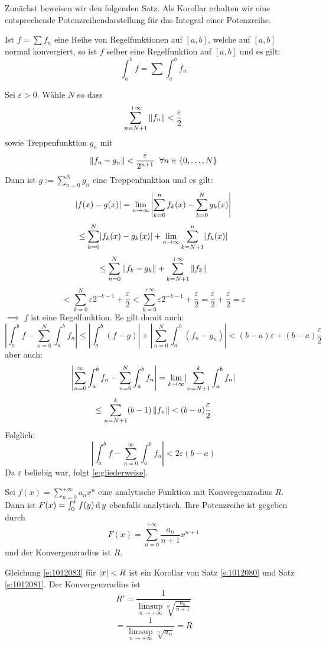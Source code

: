 Zun\"achst beweisen wir den folgenden Satz. Als Korollar erhalten wir eine
entsprechende Potenzreihendarstellung f\"ur das Integral einer Potenzreihe.

\begin{Sat}\label{s:1012081}
  Ist $f=\sum f_n$ eine Reihe von Regelfunktionen auf $[a,b]$, welche auf $[a,b]$ normal konvergiert, so ist $f$ selber eine Regelfunktion auf $[a,b]$ und es gilt:
\begin{equation}\label{e:gliederweise}
\int_a^bf=\sum\int_a^bf_n
 \end{equation}

\end{Sat}
\begin{Bew}
  Sei $\varepsilon>0$. W\"ahle $N$ so dass
  \[\sum^{+\infty}_{n=N+1}\left\| f_n \right\|<\frac{\varepsilon}{2}\]
  sowie Treppenfunktion $g_n$ mit
  \[\left\| f_n-g_n \right\|<\frac{\varepsilon}{2^{n+1}}\hspace{2mm}\forall n\in\left\{ 0,\dots,N \right\}\]
  Dann ist $g:=\sum_{n=0}^Ng_n$ eine Treppenfunktion und es gilt:
  \[\mathopen| f(x)-g(x) \mathclose|=\displaystyle\lim_{n\rightarrow\infty}\left|\sum_{k=0}^nf_k(x)-\sum^N_{k=0}g_k(x)\right|\]
  \[\leq\sum_{k=0}^N\mathopen| f_k(x)-g_k(x) \mathclose|+\displaystyle\lim_{n\rightarrow\infty}\sum^n_{k=N+1}\mathopen| f_k(x) \mathclose|\]
  \[\leq\sum^N_{n=0}\left\| f_k-g_k \right\|+\sum^{+\infty}_{k=N+1}\left\| f_k \right\|\]
  \[<\sum_{k=0}^N\varepsilon 2^{-k-1}+\frac{\varepsilon}{2}<\sum^{+\infty}_{k=0}\varepsilon2^{-k-1}+\frac{\varepsilon}{2}=\frac{\varepsilon}{2}+\frac{\varepsilon}{2}=\varepsilon\]
  $\implies$ $f$ ist eine Regelfunktion. Es gilt damit auch:
  \[\left|\int_a^bf-\sum^N_{n=0}\int_a^bf_n\right|
 \leq\left|\int_a^b(f-g)\right|+\left|\sum_{n=0}^N\int_a^b(f_n-g_n)\right|
 <(b-a)\varepsilon+(b-a)\frac{\varepsilon}{2}\]
  aber auch:
  \[\left|\sum_{n=0}^\infty\int_a^bf_n-\sum_{n=0}^N\int_a^bf_n\right|
  =\displaystyle\lim_{k\rightarrow\infty}\mathopen| \sum_{n=N+1}^k\int_a^bf_n \mathclose|\]
  \[\leq\sum^k_{n=N+1}(b-1)\left\| f_n \right\| <(b-a)\frac{\varepsilon}{2}\]
  Folglich:
  \[\left|\int_a^bf-\sum_{n=0}^\infty\int_a^bf_n\right|<2\varepsilon(b-a)\]
  Da $\varepsilon$ beliebig war, folgt \eqref{e:gliederweise}.
\end{Bew}
\begin{Kor}
  Sei $f(x)=\sum_{n=0}^{+\infty}a_nx^n$ eine analytische Funktion mit Konvergenzradius $R$. Dann ist $F(x)=\int_0^xf(y)\operatorname{d} y$ ebenfalls analytisch. Ihre Potenzreihe ist gegeben durch
  \begin{equation}\label{e:1012083}
    F(x)=\sum^{+\infty}_{n=0}\frac{a_n}{n+1}x^{n+1}
  \end{equation}
  und der Konvergenzradius ist $R$.
\end{Kor}
\begin{Bew}
  Gleichung \eqref{e:1012083} für $\mathopen| x \mathclose|<R$ ist ein Korollar von Satz \ref{s:1012080} und 
Satz \ref{s:1012081}. Der Konvergenzradius ist
  \[R'=\frac{1}{\limsup_{n\rightarrow+\infty}\sqrt[n]{\frac{a_n}{n+1}}}\]
  \[=\frac{1}{\limsup_{n\rightarrow+\infty}\sqrt[n]{a_n}}=R\]
\end{Bew}
